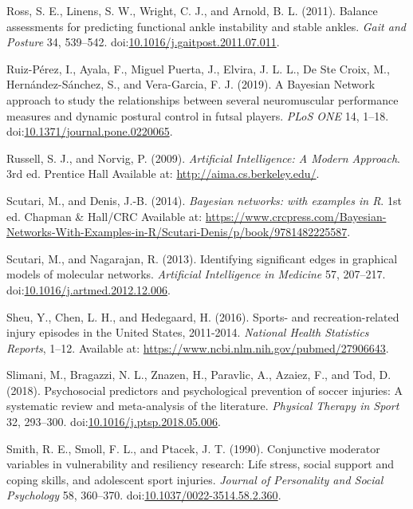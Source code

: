 \documentclass[
  english,
  man]{apa6}
\newlength{\cslhangindent}
\newenvironment{cslreferences}%
  {\setlength{\parindent}{0pt}%
  \everypar{\setlength{\hangindent}{\cslhangindent}}\ignorespaces}%
  {\par}
\begin{document}
\begin{cslreferences}
\leavevmode\hypertarget{ref-Ross2011}{}%
Ross, S. E., Linens, S. W., Wright, C. J., and Arnold, B. L. (2011). Balance assessments for predicting functional ankle instability and stable ankles. \emph{Gait and Posture} 34, 539--542. doi:\href{https://doi.org/10.1016/j.gaitpost.2011.07.011}{10.1016/j.gaitpost.2011.07.011}.

\leavevmode\hypertarget{ref-Ruiz-Perez2019}{}%
Ruiz-Pérez, I., Ayala, F., Miguel Puerta, J., Elvira, J. L. L., De Ste Croix, M., Hernández-Sánchez, S., and Vera-Garcia, F. J. (2019). A Bayesian Network approach to study the relationships between several neuromuscular performance measures and dynamic postural control in futsal players. \emph{PLoS ONE} 14, 1--18. doi:\href{https://doi.org/10.1371/journal.pone.0220065}{10.1371/journal.pone.0220065}.

\leavevmode\hypertarget{ref-Norvig2009}{}%
Russell, S. J., and Norvig, P. (2009). \emph{Artificial Intelligence: A Modern Approach}. 3rd ed. Prentice Hall Available at: \url{http://aima.cs.berkeley.edu/}.

\leavevmode\hypertarget{ref-Scutari2014}{}%
Scutari, M., and Denis, J.-B. (2014). \emph{Bayesian networks: with examples in R}. 1st ed. Chapman \& Hall/CRC Available at: \url{https://www.crcpress.com/Bayesian-Networks-With-Examples-in-R/Scutari-Denis/p/book/9781482225587}.

\leavevmode\hypertarget{ref-Scutari2013}{}%
Scutari, M., and Nagarajan, R. (2013). Identifying significant edges in graphical models of molecular networks. \emph{Artificial Intelligence in Medicine} 57, 207--217. doi:\href{https://doi.org/10.1016/j.artmed.2012.12.006}{10.1016/j.artmed.2012.12.006}.

\leavevmode\hypertarget{ref-Sheu2016}{}%
Sheu, Y., Chen, L. H., and Hedegaard, H. (2016). Sports- and recreation-related injury episodes in the United States, 2011-2014. \emph{National Health Statistics Reports}, 1--12. Available at: \url{https://www.ncbi.nlm.nih.gov/pubmed/27906643}.

\leavevmode\hypertarget{ref-Slimani2018}{}%
Slimani, M., Bragazzi, N. L., Znazen, H., Paravlic, A., Azaiez, F., and Tod, D. (2018). Psychosocial predictors and psychological prevention of soccer injuries: A systematic review and meta-analysis of the literature. \emph{Physical Therapy in Sport} 32, 293--300. doi:\href{https://doi.org/10.1016/j.ptsp.2018.05.006}{10.1016/j.ptsp.2018.05.006}.

\leavevmode\hypertarget{ref-Smith1990}{}%
Smith, R. E., Smoll, F. L., and Ptacek, J. T. (1990). Conjunctive moderator variables in vulnerability and resiliency research: Life stress, social support and coping skills, and adolescent sport injuries. \emph{Journal of Personality and Social Psychology} 58, 360--370. doi:\href{https://doi.org/10.1037/0022-3514.58.2.360}{10.1037/0022-3514.58.2.360}.


\end{cslreferences}
\end{document}
